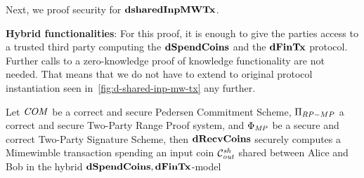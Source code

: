 Next, we proof security for $\mathbf{dsharedInpMWTx}$.

\textbf{Hybrid functionalities}: For this proof, it is enough to give the parties access to a trusted third party computing the $\mathbf{dSpendCoins}$ and the $\mathbf{dFinTx}$ protocol.
Further calls to a zero-knowledge proof of knowledge functionality are not needed.
That means that we do not have to extend to original protocol instantiation seen in~\cref{fig:d-shared-inp-mw-tx} any further.

\begin{theorem}
    \label{teo:atom:sec-dshared-inp}
    Let $\mathit{COM}$ be a correct and secure Pedersen Commitment Scheme, $\Pi_{RP-MP}$ a correct and secure Two-Party Range Proof system, and $\Phi_{\mathit{MP}}$ be a secure and correct Two-Party Signature Scheme, then $\mathbf{dRecvCoins}$ securely computes a Mimewimble transaction spending an input coin $\mathcal{C}_{\mathit{out}}^{\mathit{sh}}$ shared between Alice and Bob in the hybrid $\mathbf{dSpendCoins},\mathbf{dFinTx}$-model
\end{theorem}

